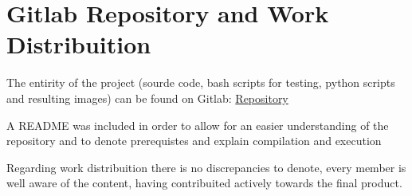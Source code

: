 \documentclass[12pt,a4paper]{article}
\begin{document}
\section{Gitlab Repository and Work Distribuition}
\label{sec:git}

The entirity of the project (sourde code, bash scripts for testing, python scripts and resulting images) 
can be found on Gitlab: \href{https://gitlab.up.pt/classes/cpd/2526/t07/g13/-/tree/main/assign1?ref_type=heads}{Repository} 

A README was included in order to allow for an easier understanding of the repository and to denote prerequistes and explain compilation and execution

Regarding work distribuition there is no discrepancies to denote, every member is well aware of the content, having contribuited actively towards the final product.
\end{document}
